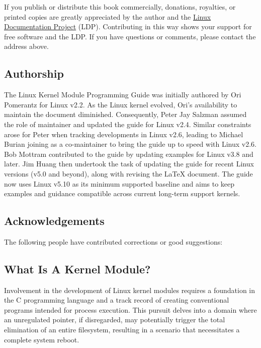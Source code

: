 \documentclass[10pt, oneside]{book}
\begin{document}
If you publish or distribute this book commercially, donations, royalties,
or printed copies are greatly appreciated by the author and the \href{https://tldp.org/}{Linux Documentation Project} (LDP).
Contributing in this way shows your support for free software and the LDP.
If you have questions or comments, please contact the address above.

\subsection{Authorship}
\label{sec:authorship}

The Linux Kernel Module Programming Guide was initially authored by Ori Pomerantz for Linux v2.2.
As the Linux kernel evolved, Ori's availability to maintain the document diminished.
Consequently, Peter Jay Salzman assumed the role of maintainer and updated the guide for Linux v2.4.
Similar constraints arose for Peter when tracking developments in Linux v2.6,
leading to Michael Burian joining as a co-maintainer to bring the guide up to speed with Linux v2.6.
Bob Mottram contributed to the guide by updating examples for Linux v3.8 and later.
Jim Huang then undertook the task of updating the guide for recent Linux versions (v5.0 and beyond),
along with revising the LaTeX document.
The guide now uses Linux v5.10 as its minimum supported baseline and aims to keep examples and guidance compatible across current long-term support kernels.

\subsection{Acknowledgements}
\label{sec:acknowledgements}

The following people have contributed corrections or good suggestions:

\begin{flushleft}

\end{flushleft}

\subsection{What Is A Kernel Module?}
\label{sec:kernelmod}

Involvement in the development of Linux kernel modules requires a foundation in the C programming language and a track record of creating conventional programs intended for process execution.
This pursuit delves into a domain where an unregulated pointer, if disregarded,
may potentially trigger the total elimination of an entire filesystem,
resulting in a scenario that necessitates a complete system reboot.
\end{document}
